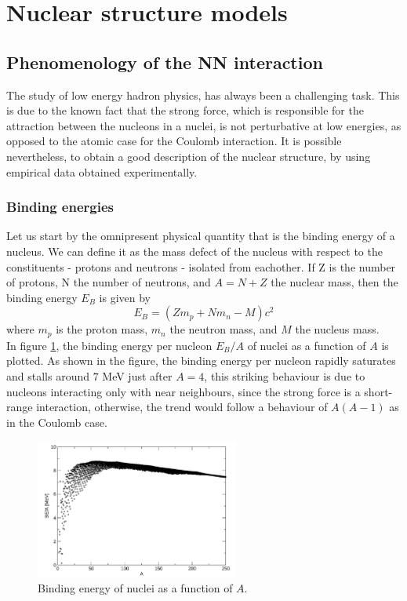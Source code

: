 \section{Nuclear structure models}
\label{sec:models}
\subsection{Phenomenology of the NN interaction}
The study of low energy hadron physics, has always been a challenging task. This is due to the known fact that the strong force, which is responsible for the attraction between the nucleons in a nuclei, is not perturbative at low energies, as opposed to the atomic case for the Coulomb interaction.
It is possible nevertheless, to obtain a good description of the nuclear structure, by using empirical data obtained experimentally.
\subsubsection{Binding energies}
Let us start by the omnipresent physical quantity that is the binding energy of a nucleus. We can define it as the mass defect of the nucleus with respect to the constituents - protons and neutrons - isolated from eachother. If Z is the number of protons, N the number of neutrons, and $A=N+Z$ the nuclear mass, then the binding energy $E_B$ is given by
\begin{equation}
    \label{eq:binding_energy}
    E_B = (Zm_p + Nm_n - M)c^2
\end{equation}
where $m_p$ is the proton mass, $m_n$ the neutron mass, and $M$ the nucleus mass.
\\In figure \ref{fig:BE}, the binding energy per nucleon $E_B/A$ of nuclei as a function of $A$ is plotted. As shown in the figure, the binding energy per nucleon rapidly saturates and stalls around $7$ MeV just after $A=4$, this striking behaviour is due to nucleons interacting only with near neighbours, since the strong force is a short-range interaction, otherwise, the trend would follow a behaviour of $A(A-1)$ as in the Coulomb case.
\begin{figure}[H]
    \centering
    \includegraphics[width=0.6\textwidth]{Images/BE.png}
    \caption{Binding energy of nuclei as a function of $A$.}
    \label{fig:BE}
\end{figure}
